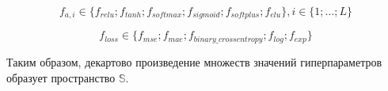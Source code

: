 \begin{equation}\label{eq:hyper4}
  f_{a,i} \in \{f_{relu}; f_{tanh}; f_{softmax}; f_{sigmoid}; f_{softplus}; f_{elu}\}, i \in \{1; \dots; L\}
\end{equation}

\begin{equation}\label{eq:hyper4}
  f_{loss} \in \{f_{mse}; f_{mae}; f_{binary\_crossentropy}; f_{log}; f_{exp}\}
\end{equation}

Таким образом, декартово произведение множеств значений гиперпараметров образует пространство $\mathbb{S}$.

\newpage 